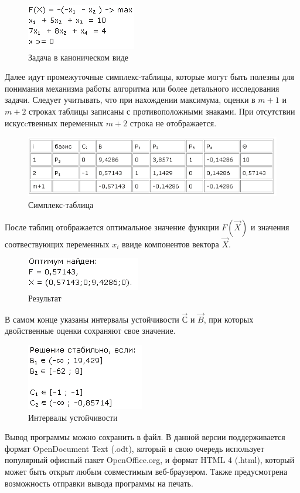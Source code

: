 \documentclass[pdftex, unicode, a4paper,12pt,oneside,utf8x, usehyperref]{report-gost}
\begin{document}
\begin{figure}[ht]
\centering
\includegraphics[scale=1.0]{img/canonical.png}
\caption{Задача в каноническом виде}
\end{figure}

Далее идут промежуточные симплекс-таблицы, которые могут быть полезны для понимания механизма работы алгоритма или более детального исследования задачи. Следует учитывать, что при нахождении максимума, оценки в $m+1$ и $m+2$ строках таблицы записаны с противоположными знаками. При отсутствии искусcтвенных переменных $m+2$ строка не отображается.

\begin{figure}[hb]
\centering
\includegraphics[scale=1.0]{img/simplextable.png}
\caption{Симплекс-таблица}
\end{figure}
После таблиц отображается оптимальное значение функции $F(\vec{X})$ и значения соотвествующих переменных $x_{i}$ ввиде компонентов вектора $\vec{X}$.

\newpage
\clearpage

\begin{figure}[ht]
\centering
\includegraphics[scale=1.0]{img/result.png}
\caption{Результат}
\end{figure}

В самом конце указаны интервалы устойчивости $\vec{С}$ и $\vec{B}$, при которых двойственные оценки сохраняют свое значение.
\begin{figure}[hb]
\centering
\includegraphics[scale=1.0]{img/stability.png}
\caption{Интервалы устойчивости}
\end{figure}

Вывод программы можно сохранить в файл. В данной версии поддерживается формат OpenDocument Text (.odt), который в свою очередь использует популярный офисный пакет OpenOffice.org, и формат HTML 4 (.html), который может быть открыт любым совместимым веб-браузером. Также предусмотрена возможность отправки вывода программы на печать.





\backmatter
\end{document}
